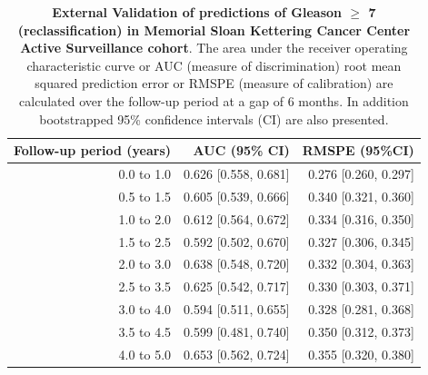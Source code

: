 \begin{table}[!htb]
\small\sf\centering
\caption{\textbf{External Validation of predictions of Gleason $\geq$ 7 (reclassification) in Memorial Sloan Kettering Cancer Center Active Surveillance cohort}. The area under the receiver operating characteristic curve or AUC (measure of discrimination) root mean squared prediction error or RMSPE (measure of calibration) are calculated over the follow-up period at a gap of 6 months. In addition bootstrapped 95\% confidence intervals (CI) are also presented.}
\label{tab:AUC_PE_MSKCC}
\begin{tabular}{r|r|r}
\hline
\hline
Follow-up period (years) & AUC (95\% CI) & RMSPE (95\%CI)\\ 
\hline
0.0 to 1.0 & 0.626 [0.558, 0.681]  & 0.276 [0.260, 0.297]\\
0.5 to 1.5 & 0.605 [0.539, 0.666]  & 0.340 [0.321, 0.360]\\
1.0 to 2.0 & 0.612 [0.564, 0.672]  & 0.334 [0.316, 0.350]\\
1.5 to 2.5 & 0.592 [0.502, 0.670]  & 0.327 [0.306, 0.345]\\
2.0 to 3.0 & 0.638 [0.548, 0.720]  & 0.332 [0.304, 0.363]\\
2.5 to 3.5 & 0.625 [0.542, 0.717]  & 0.330 [0.303, 0.371]\\
3.0 to 4.0 & 0.594 [0.511, 0.655]  & 0.328 [0.281, 0.368]\\
3.5 to 4.5 & 0.599 [0.481, 0.740]  & 0.350 [0.312, 0.373]\\
4.0 to 5.0 & 0.653 [0.562, 0.724]  & 0.355 [0.320, 0.380]\\
\hline
\end{tabular}	
\end{table}

